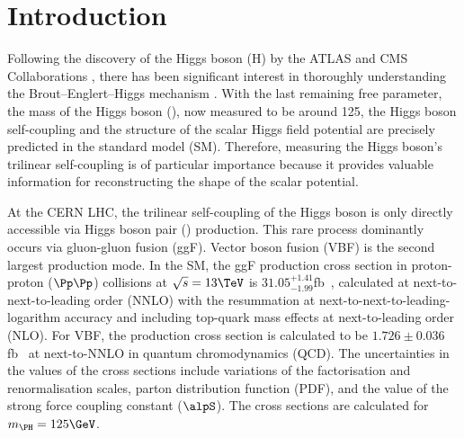 \documentclass[11pt,twoside,a4paper,cmspaper,final,collab]{cms-tdr}
\begin{document}

\maketitle

\section{Introduction}\label{sec:intro}
Following the discovery of the Higgs boson (H) by the ATLAS and CMS Collaborations \cite{HiggsdiscoveryAtlas, Chatrchyan:2012ufa, Chatrchyan:2013lba}, there has been significant interest in thoroughly understanding the Brout--Englert--Higgs mechanism \cite{Higgs1, Higgs:1964pj}. With the last remaining free parameter, the mass of the Higgs boson (\mH), now measured to be around 125\GeV, the Higgs boson self-coupling and the structure of the scalar Higgs field potential are precisely predicted in the standard model (SM). Therefore, measuring the Higgs boson's trilinear self-coupling \lbdHHH is of particular importance because it provides valuable information for reconstructing the shape of the scalar potential.

At the CERN LHC, the trilinear self-coupling of the Higgs boson is only directly accessible via Higgs boson pair (\HH) production. 
This rare process dominantly occurs via gluon-gluon fusion (ggF). Vector boson fusion (VBF) is the second largest production mode. 
In the SM, the ggF production cross section in proton-proton ($\Pp\Pp$) collisions at $\sqrt{s} = 13\TeV$ is $31.05^{+1.41}_{-1.99}$\unit{fb}~\cite{Grazzini:2018bsd,Dawson:1998py,Borowka:2016ehy,Baglio:2018lrj,deFlorian:2013jea,Shao:2013bz,deFlorian:2015moa}, calculated at
next-to-next-to-leading order (NNLO) with the resummation at next-to-next-to-leading-logarithm
accuracy and including top-quark mass effects at next-to-leading order (NLO). For VBF, the production cross section is calculated to be $1.726\pm 0.036$\unit{fb}~\cite{Dreyer:2018qbw,Baglio:2012np,Liu-Sheng:2014gxa} at next-to-NNLO in quantum chromodynamics (QCD). The
uncertainties in the values of the cross sections include variations of the factorisation and renormalisation scales, parton distribution function (PDF), and the value of the strong force coupling constant ($\alpS$). The cross sections are calculated for $\mH = 125\GeV$.
\end{document}
